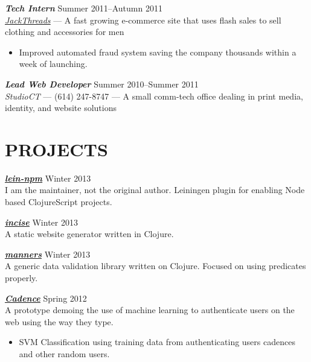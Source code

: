 \documentclass[line,letterpaper]{resume}
\begin{document}
\begin{resume}
    {\sl\textbf{Tech Intern}} \hfill Summer 2011--Autumn 2011\\
    \emph{\underline{\href{http://www.jackthreads.com/}{JackThreads}}}
    --- A fast growing e-commerce site that uses flash sales to sell clothing and
    accessories for men
    \begin{itemize}
        \item Improved automated fraud system saving the company
            thousands within a week of launching.
    \end{itemize}
    \vspace{-6pt}

    {\sl\textbf{Lead Web Developer}} \hfill Summer 2010--Summer 2011\\
    \emph{StudioCT} --- (614) 247-8747 --- A small comm-tech office dealing
    in print media, identity, and website solutions
    \vspace{-6pt}


    \section{\uppercase{Projects}}
    {\sl\textbf{\underline{\href{https://github.com/RyanMcG/lein-npm}{lein-npm}}}}
    \hfill Winter 2013\\
    I am the maintainer, not the original author. Leiningen plugin for enabling Node based ClojureScript projects.
    \vspace{-6pt}

    {\sl\textbf{\underline{\href{https://github.com/RyanMcG/incise}{incise}}}}
    \hfill Winter 2013\\
    A static website generator written in Clojure.
    \vspace{-6pt}

    {\sl\textbf{\underline{\href{https://github.com/RyanMcG/manners}{manners}}}}
    \hfill Winter 2013\\
    A generic data validation library written on Clojure.
    Focused on using predicates properly.
    \vspace{-6pt}

    {\sl\textbf{\underline{\href{https://github.com/RyanMcG/Cadence}{Cadence}}}}
    \hfill Spring 2012\\
    A prototype demoing the use of machine learning to authenticate users on the
    web using the way they type.
    \begin{itemize}
        \item SVM Classification using training data from authenticating users
            cadences and other random users.
    \end{itemize}
    \vspace{-6pt}


\end{resume}
\end{document}
